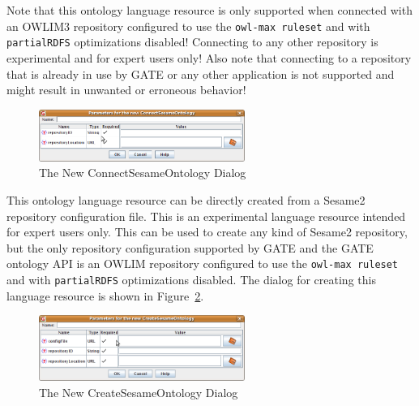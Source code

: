 Note that this ontology language resource is only supported when connected with
an OWLIM3 repository configured to use the \texttt{owl-max ruleset} and with
\texttt{partialRDFS} optimizations disabled! Connecting to any other repository
is experimental and for expert users only! Also note that connecting to a
repository that is already in use by GATE or any other application is not
supported and might result in unwanted or erroneous behavior!

\begin{figure}[htbp]
\begin{center}
\includegraphics[width=0.6\textwidth]{ontology_lrconn_new.png}
\caption{The New ConnectSesameOntology Dialog}
\label{fig:ontology_lrconn_new}
\end{center}
\end{figure}



This ontology language resource can be directly created from a Sesame2
repository configuration file. This is an experimental language resource 
intended for expert users only. This can be used to create any kind 
of Sesame2 repository, but the only repository configuration supported 
by GATE and the GATE ontology API is an OWLIM repository configured to use 
the \texttt{owl-max ruleset} and with \texttt{partialRDFS} optimizations
disabled.  The dialog for creating this language resource is shown in
Figure~\ref{fig:ontology_lrcreate_new}.

\begin{figure}[htbp]
\begin{center}
\includegraphics[width=0.6\textwidth]{ontology_lrcreate_new.png}
\caption{The New CreateSesameOntology Dialog}
\label{fig:ontology_lrcreate_new}
\end{center}
\end{figure}


